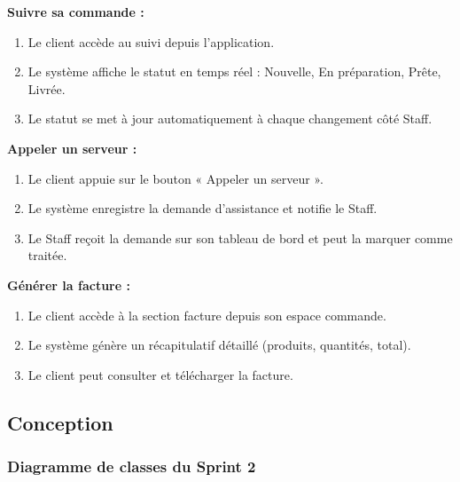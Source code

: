 \textbf{Suivre sa commande :}
\begin{enumerate}
\item Le client accède au suivi depuis l'application.
\item Le système affiche le statut en temps réel : Nouvelle, En préparation, Prête, Livrée.
\item Le statut se met à jour automatiquement à chaque changement côté Staff.
\end{enumerate}

\textbf{Appeler un serveur :}
\begin{enumerate}
\item Le client appuie sur le bouton « Appeler un serveur ».
\item Le système enregistre la demande d'assistance et notifie le Staff.
\item Le Staff reçoit la demande sur son tableau de bord et peut la marquer comme traitée.
\end{enumerate}

\textbf{Générer la facture :}
\begin{enumerate}
\item Le client accède à la section facture depuis son espace commande.
\item Le système génère un récapitulatif détaillé (produits, quantités, total).
\item Le client peut consulter et télécharger la facture.
\end{enumerate}

\subsection{Conception}

\subsubsection{Diagramme de classes du Sprint 2}


